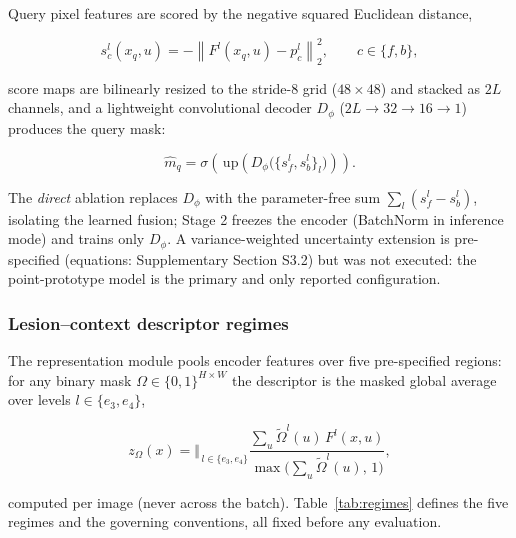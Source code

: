 \documentclass[jimh,article,submit,moreauthors,pdftex]{Definitions/tsp}
\begin{document}
Query pixel features are scored by the negative squared Euclidean
distance,

\begin{equation}
  s_{c}^{l}(x_q,u)
  =-\left\|F^l(x_q,u)-p_c^l\right\|_2^2,
  \qquad c\in\{f,b\},
  \label{eq:seg_similarity}
\end{equation}

score maps are bilinearly resized to the stride-8 grid ($48\times48$)
and stacked as $2L$ channels, and a lightweight convolutional decoder
$D_\phi$ ($2L\!\rightarrow\!32\!\rightarrow\!16\!\rightarrow\!1$)
produces the query mask:

\begin{equation}
  \hat m_q
  = \sigma\left(\,\mathrm{up}\!\left(
    D_\phi\bigl(\{s_f^l, s_b^l\}_{l}\bigr)\right)\right).
  \label{eq:query_mask}
\end{equation}

The \emph{direct} ablation replaces $D_\phi$ with the parameter-free sum
$\sum_l (s_f^l - s_b^l)$, isolating the learned fusion; Stage 2 freezes
the encoder (BatchNorm in inference mode) and trains only $D_\phi$. A
variance-weighted uncertainty extension is pre-specified (equations:
Supplementary Section S3.2) but was not executed: the point-prototype
model is the primary and only reported configuration.

\subsubsection{Lesion--context descriptor regimes}
\label{subsubsec:descriptor_regimes}

The representation module pools encoder features over five pre-specified
regions: for any binary mask $\Omega\in\{0,1\}^{H\times W}$ the
descriptor is the masked global average over levels
$l\in\{e_3, e_4\}$,

\begin{equation}
  z_{\Omega}(x)
  = \Big\Vert_{\,l\in\{e_3,e_4\}}
    \frac{\sum_u \tilde\Omega^{l}(u)\,F^{l}(x,u)}
         {\max\!\bigl(\sum_u \tilde\Omega^{l}(u),\,1\bigr)},
  \label{eq:masked_gap}
\end{equation}

computed per image (never across the batch).
Table~\ref{tab:regimes} defines the five regimes and the governing
conventions, all fixed before any evaluation.
\end{document}
